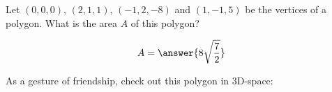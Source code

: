 \documentclass{ximera}
\author{Gregory Hartman \and Matthew Carr}
\begin{document}
\begin{exercise}

Let $(0,0,0)$, $(2,1,1)$, $(-1,2,-8)$  and $(1,-1,5)$ be the vertices of a polygon. What is the area $A$ of this polygon?
\begin{prompt}
\[
A=\answer{8\sqrt{\frac{7}{2}}}
\]
\end{prompt}
\begin{onlineOnly}
  As a gesture of friendship, check out this polygon in $3$D-space:
  \begin{center}  
  \end{center}
\end{onlineOnly}

\end{exercise}
\end{document}
